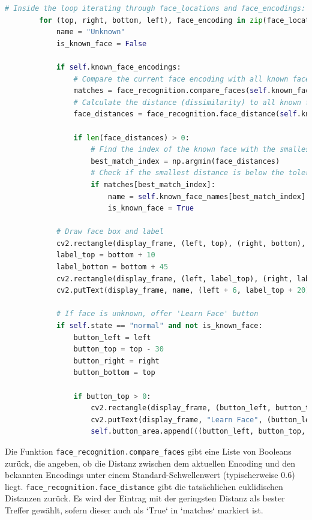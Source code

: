 \begin{lstlisting}[language=Python, caption={Vergleich von Gesichts-Encodings}, label={lst:yolo_compare}, inputencoding=utf8]
        # Inside the loop iterating through face_locations and face_encodings:
        for (top, right, bottom, left), face_encoding in zip(face_locations, face_encodings):
            name = "Unknown"
            is_known_face = False

            if self.known_face_encodings:
                # Compare the current face encoding with all known face encodings
                matches = face_recognition.compare_faces(self.known_face_encodings, face_encoding)
                # Calculate the distance (dissimilarity) to all known faces
                face_distances = face_recognition.face_distance(self.known_face_encodings, face_encoding)

                if len(face_distances) > 0:
                    # Find the index of the known face with the smallest distance
                    best_match_index = np.argmin(face_distances)
                    # Check if the smallest distance is below the tolerance threshold
                    if matches[best_match_index]:
                        name = self.known_face_names[best_match_index]
                        is_known_face = True

            # Draw face box and label
            cv2.rectangle(display_frame, (left, top), (right, bottom), (0, 0, 255), 2) # Red box for unknown/known
            label_top = bottom + 10
            label_bottom = bottom + 45
            cv2.rectangle(display_frame, (left, label_top), (right, label_bottom), (0, 0, 255), cv2.FILLED)
            cv2.putText(display_frame, name, (left + 6, label_top + 20), cv2.FONT_HERSHEY_DUPLEX, 0.7, (255, 255, 255), 1)

            # If face is unknown, offer 'Learn Face' button
            if self.state == "normal" and not is_known_face:
                button_left = left
                button_top = top - 30
                button_right = right
                button_bottom = top

                if button_top > 0:
                    cv2.rectangle(display_frame, (button_left, button_top), (button_right, button_bottom), (255, 0, 0), cv2.FILLED)
                    cv2.putText(display_frame, "Learn Face", (button_left + 5, button_top + 20), cv2.FONT_HERSHEY_DUPLEX, 0.5, (255, 255, 255), 1)
                    self.button_area.append(((button_left, button_top, button_right, button_bottom), (top, right, bottom, left)))
\end{lstlisting}
Die Funktion \texttt{face\_recognition.compare\_faces} gibt eine Liste von Booleans zurück, die angeben, ob die Distanz zwischen dem aktuellen Encoding und den bekannten Encodings unter einem Standard-Schwellenwert (typischerweise 0.6) liegt. \texttt{face\_recognition.face\_distance} gibt die tatsächlichen euklidischen Distanzen zurück. Es wird der Eintrag mit der geringsten Distanz als bester Treffer gewählt, sofern dieser auch als `True` in `matches` markiert ist.


